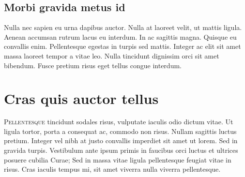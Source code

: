 \documentclass[11pt, a4paper]{memoir}
\begin{document}
\subsection{Morbi gravida metus id}
Nulla nec sapien eu urna dapibus auctor. Nulla at laoreet velit, ut mattis ligula. Aenean accumsan rutrum lacus eu interdum. In ac sagittis magna. Quisque eu convallis enim. Pellentesque egestas in turpis sed mattis. Integer ac elit sit amet massa laoreet tempor a vitae leo. Nulla tincidunt dignissim orci sit amet bibendum. Fusce pretium risus eget tellus congue interdum.

\section{Cras quis auctor tellus}
\lettrine{P}{ellentesque} tincidunt sodales risus, vulputate iaculis odio dictum vitae. Ut ligula tortor, porta a consequat ac, commodo non risus. Nullam sagittis luctus pretium. Integer vel nibh at justo convallis imperdiet sit amet ut lorem. Sed in gravida turpis. Vestibulum ante ipsum primis in faucibus orci luctus et ultrices posuere cubilia Curae; Sed in massa vitae ligula pellentesque feugiat vitae in risus. Cras iaculis tempus mi, sit amet viverra nulla viverra pellentesque.
\end{document}
